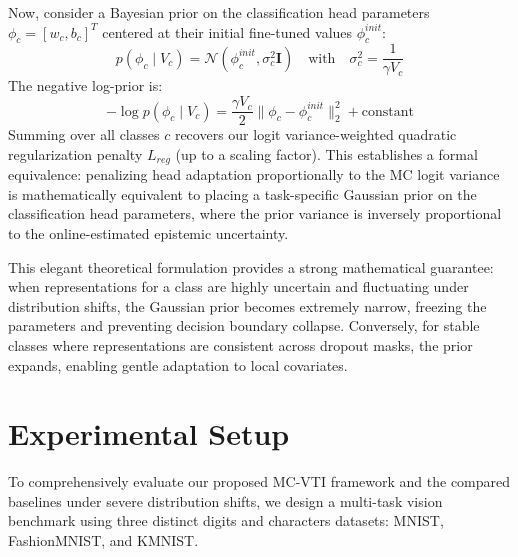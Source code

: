 \documentclass{article}
\theoremstyle{plain}
\theoremstyle{definition}
\theoremstyle{remark}
\begin{document}
Now, consider a Bayesian prior on the classification head parameters $\phi_c = [w_c, b_c]^T$ centered at their initial fine-tuned values $\phi_c^{init}$:
\begin{equation}
  p(\phi_c \mid V_c) = \mathcal{N}\left( \phi_c^{init}, \sigma_c^2 \mathbf{I} \right) \quad \text{with} \quad \sigma_c^2 = \frac{1}{\gamma V_c}
\end{equation}
The negative log-prior is:
\begin{equation}
  -\log p(\phi_c \mid V_c) = \frac{\gamma V_c}{2} \| \phi_c - \phi_c^{init} \|_2^2 + \text{constant}
\end{equation}
Summing over all classes $c$ recovers our logit variance-weighted quadratic regularization penalty $L_{reg}$ (up to a scaling factor). This establishes a formal equivalence: penalizing head adaptation proportionally to the MC logit variance is mathematically equivalent to placing a task-specific Gaussian prior on the classification head parameters, where the prior variance is inversely proportional to the online-estimated epistemic uncertainty. 

This elegant theoretical formulation provides a strong mathematical guarantee: when representations for a class are highly uncertain and fluctuating under distribution shifts, the Gaussian prior becomes extremely narrow, freezing the parameters and preventing decision boundary collapse. Conversely, for stable classes where representations are consistent across dropout masks, the prior expands, enabling gentle adaptation to local covariates.

\section{Experimental Setup}
\label{sec:experiments}
To comprehensively evaluate our proposed MC-VTI framework and the compared baselines under severe distribution shifts, we design a multi-task vision benchmark using three distinct digits and characters datasets: MNIST, FashionMNIST, and KMNIST. 
\end{document}
